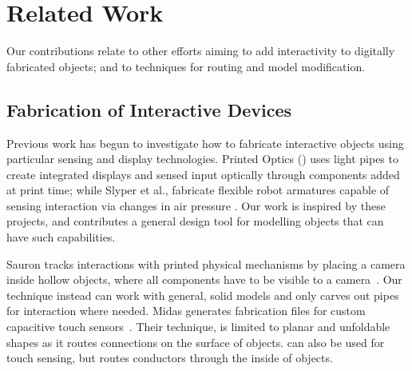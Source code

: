 \section{Related Work}
Our contributions relate to other efforts aiming to add interactivity to digitally fabricated objects; and to techniques for routing and model modification.  

\subsection{Fabrication of Interactive Devices}

Previous work has begun to investigate how to fabricate interactive objects using particular sensing and display technologies. Printed Optics (\cite{Willis-printedoptics}) uses light pipes to create integrated displays and sensed input optically through components added at print time; while Slyper et al., fabricate flexible robot armatures capable of sensing interaction via changes in air pressure \cite{Slyper-pressure}. Our work is inspired by these projects, and contributes a general design tool for modelling objects that can have such capabilities.  

Sauron tracks interactions with printed physical mechanisms by placing a camera inside hollow objects, where all components have to be visible to a camera~\cite{Savage-sauron}.  Our technique instead can work with general, solid models and only carves out pipes for interaction where needed. Midas generates fabrication files for custom capacitive touch sensors~\cite{Savage-midas}.  Their technique, is limited to planar and unfoldable shapes as it routes connections on the surface of objects. \systemname can also be used for touch sensing, but routes conductors through the inside of objects.


